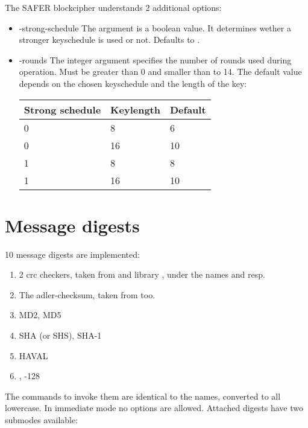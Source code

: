 \documentclass {report}
\begin{document}
The SAFER blockcipher understands 2 additional options:

\begin {itemize}
\item [-strong-schedule]
	The argument is a boolean value. It determines wether a
	stronger keyschedule is used or not. Defaults to .

\item [-rounds]
	The integer argument specifies the number of rounds used
	during operation. Must be greater than 0 and smaller than to
	14. The default value depends on the chosen keyschedule and
	the length of the key:

	\begin {tabular} {|l|l|l|}\hline
	Strong schedule & Keylength & Default	\\ \hline\hline
	0		&  8	    &	 6	\\ \hline
	0		& 16	    &	10	\\ \hline
	1		&  8	    &	 8	\\ \hline
	1		& 16	    &	10	\\ \hline
	\end  {tabular}
\end   {itemize}

\section {Message digests}

10 message digests are implemented:

\begin {enumerate}
\item	2 crc checkers, taken from \PGP{} and library \zlib, under
	the names  and  resp.
\item	The adler-checksum, taken from \zlib{} too.
\item	MD2, MD5
\item	SHA (or SHS), SHA-1
\item	HAVAL
\item	\rmd, -128
\end   {enumerate}

The commands to invoke them are identical to the names, converted to
all lowercase. In immediate mode no options are allowed. Attached
digests have two submodes available:
\end{document}
